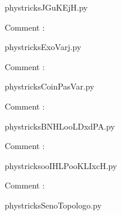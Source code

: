 
    \newcommand{\CaptionFigJGuKEjH}{<+Type your caption here+>}
    \begin{center}
        
    \end{center}
    phystricksJGuKEjH.py

    Comment : 

    \clearpage
    


    \newcommand{\CaptionFigExoVarj}{<+Type your caption here+>}
    \begin{center}
        
    \end{center}
    phystricksExoVarj.py

    Comment : 

    \clearpage
    


    \newcommand{\CaptionFigCoinPasVar}{<+Type your caption here+>}
    \begin{center}
        
    \end{center}
    phystricksCoinPasVar.py

    Comment : 

    \clearpage
    


    \newcommand{\CaptionFigBNHLooLDxdPA}{<+Type your caption here+>}
    \begin{center}
        
    \end{center}
    phystricksBNHLooLDxdPA.py

    Comment : 

    \clearpage
    


    \newcommand{\CaptionFigooIHLPooKLIxcH}{<+Type your caption here+>}
    \begin{center}
        
    \end{center}
    phystricksooIHLPooKLIxcH.py

    Comment : 

    \clearpage
    


    \newcommand{\CaptionFigSenoTopologo}{<+Type your caption here+>}
    \begin{center}
        
    \end{center}
    phystricksSenoTopologo.py

